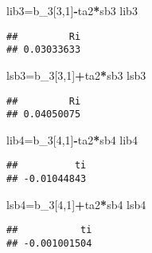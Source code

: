 \documentclass[
]{article}
\newenvironment{Shaded}{\begin{snugshade}}{\end{snugshade}}
\newcommand{\DecValTok}[1]{\textcolor[rgb]{0.00,0.00,0.81}{#1}}
\newcommand{\NormalTok}[1]{#1}
\newcommand{\OperatorTok}[1]{\textcolor[rgb]{0.81,0.36,0.00}{\textbf{#1}}}
\begin{document}
\begin{Shaded}
\begin{Highlighting}[]
\NormalTok{lib3=b_}\DecValTok{3}\NormalTok{[}\DecValTok{3}\NormalTok{,}\DecValTok{1}\NormalTok{]}\OperatorTok{-}\NormalTok{ta2}\OperatorTok{*}\NormalTok{sb3}
\NormalTok{lib3}
\end{Highlighting}
\end{Shaded}

\begin{verbatim}
##         Ri 
## 0.03033633
\end{verbatim}

\begin{Shaded}
\begin{Highlighting}[]
\NormalTok{lsb3=b_}\DecValTok{3}\NormalTok{[}\DecValTok{3}\NormalTok{,}\DecValTok{1}\NormalTok{]}\OperatorTok{+}\NormalTok{ta2}\OperatorTok{*}\NormalTok{sb3}
\NormalTok{lsb3}
\end{Highlighting}
\end{Shaded}

\begin{verbatim}
##         Ri 
## 0.04050075
\end{verbatim}

\begin{Shaded}
\begin{Highlighting}[]
\NormalTok{lib4=b_}\DecValTok{3}\NormalTok{[}\DecValTok{4}\NormalTok{,}\DecValTok{1}\NormalTok{]}\OperatorTok{-}\NormalTok{ta2}\OperatorTok{*}\NormalTok{sb4}
\NormalTok{lib4}
\end{Highlighting}
\end{Shaded}

\begin{verbatim}
##          ti 
## -0.01044843
\end{verbatim}

\begin{Shaded}
\begin{Highlighting}[]
\NormalTok{lsb4=b_}\DecValTok{3}\NormalTok{[}\DecValTok{4}\NormalTok{,}\DecValTok{1}\NormalTok{]}\OperatorTok{+}\NormalTok{ta2}\OperatorTok{*}\NormalTok{sb4}
\NormalTok{lsb4}
\end{Highlighting}
\end{Shaded}

\begin{verbatim}
##           ti 
## -0.001001504
\end{verbatim}
\end{document}
